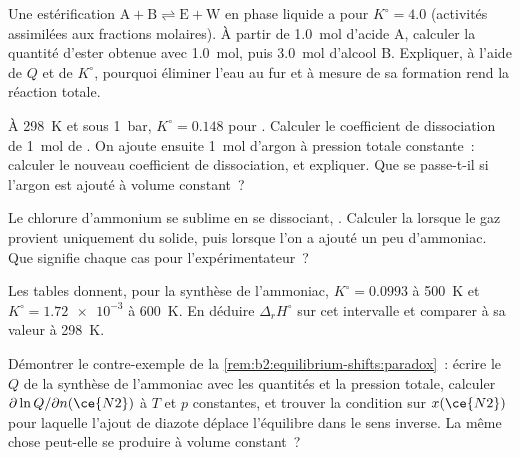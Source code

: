 \begin{exercise}[$\star\star$]\label{exo:b2:equilibrium-shifts:6}
Une estérification $\mathrm{A + B \rightleftharpoons E + W}$ en phase liquide
a pour $K^\circ = 4.0$ (activités assimilées aux fractions molaires). À partir de
\qty{1.0}{mol} d'acide A, calculer la quantité d'ester obtenue avec \qty{1.0}{mol}, puis
\qty{3.0}{mol} d'alcool B. Expliquer, à l'aide de $Q$ et de $K^\circ$, pourquoi éliminer
l'eau au fur et à mesure de sa formation rend la réaction totale.
\end{exercise}

\begin{exercise}[$\star\star$]\label{exo:b2:equilibrium-shifts:7}
À \qty{298}{K} et sous \qty{1}{bar}, $K^\circ = 0.148$ pour .
Calculer le coefficient de dissociation de \qty{1}{mol} de . On ajoute ensuite
\qty{1}{mol} d'argon à pression totale constante~: calculer le nouveau
coefficient de dissociation, et expliquer. Que se passe-t-il si l'argon est ajouté à
volume constant~?
\end{exercise}

\begin{exercise}[$\star\star$]\label{exo:b2:equilibrium-shifts:8}
Le chlorure d'ammonium se sublime en se dissociant, . Calculer la  lorsque le gaz provient uniquement du solide, puis lorsque
l'on a ajouté un peu d'ammoniac. Que signifie chaque cas pour l'expérimentateur~?
\end{exercise}

\begin{exercise}[$\star\star$]\label{exo:b2:equilibrium-shifts:9}
Les tables donnent, pour la synthèse de l'ammoniac, $K^\circ = 0.0993$ à \qty{500}{K} et
$K^\circ = \num{1.72e-3}$ à \qty{600}{K}. En déduire $\Delta_r H^\circ$ sur cet
intervalle et comparer à sa valeur à \qty{298}{K}.
\end{exercise}

\begin{exercise}[$\star\star\star$]\label{exo:b2:equilibrium-shifts:10}
Démontrer le contre-exemple de la \cref{rem:b2:equilibrium-shifts:paradox}~: écrire
le $Q$ de la synthèse de l'ammoniac avec les quantités et la pression totale, calculer
$\partial\ln Q/\partial n(\ce{N2})$ à $T$ et $p$ constantes, et trouver la
condition sur $x(\ce{N2})$ pour laquelle l'ajout de diazote déplace l'équilibre
dans le sens inverse. La même chose peut-elle se produire à volume constant~?
\end{exercise}

